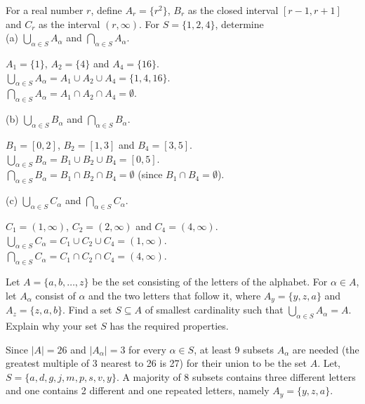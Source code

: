 \documentclass[12pt]{article}
\newenvironment{problem}[2][Problem]{\begin{trivlist}
		\item[\hskip \labelsep {\bfseries #1}\hskip \labelsep {\bfseries #2.}]}{\end{trivlist}}
\newenvironment{solution}[2][Solution]{\begin{trivlist}
		\item[\hskip \labelsep {\bfseries #1}\hskip \labelsep {\bfseries #2.}]}{\end{trivlist}}
\begin{document}
	\begin{problem}{38}
		For a real number $r$, define $A_r = \{r^{2}\}$, $B_r$ as the closed interval $[r-1,r+1]$ and $C_r$ as the interval $(r, \infty)$. For $S=\{1,2,4\}$, determine\\
		
		(a) $\bigcup_{\alpha \in S}A_{\alpha}$ and $\bigcap_{\alpha \in S}A_{\alpha}$.
		\begin{solution}{a}
			$A_{1} = \{1\}$, $A_{2} = \{4\}$ and $A_{4} = \{16\}$.\\
			 $\bigcup_{\alpha \in S}A_{\alpha} = A_{1}\cup A_{2} \cup A_{4} = \{1,4,16\}$.\\
			 $\bigcap_{\alpha \in S}A_{\alpha} = A_{1}\cap A_{2} \cap A_{4} = \emptyset$. 
		\end{solution}
	
		(b) $\bigcup_{\alpha \in S}B_{\alpha}$ and $\bigcap_{\alpha \in S}B_{\alpha}$.
		\begin{solution}{b}
			$B_{1} = [0,2]$, $B_{2}= [1,3]$ and $B_{4} = [3,5]$.\\
			$\bigcup_{\alpha \in S}B_{\alpha} = B_{1}\cup B_{2}\cup B_{4} = [0,5]$.\\
			$\bigcap_{\alpha \in S}B_{\alpha} = B_{1}\cap B_{2}\cap B_{4} = \emptyset$ (since $B_{1}\cap B_{4} = \emptyset$).\\
		\end{solution}
	
		(c) $\bigcup_{\alpha \in S}C_{\alpha}$ and $\bigcap_{\alpha \in S}C_{\alpha}$.
		\begin{solution}{c}
			$C_{1} = (1,\infty)$, $C_{2} = (2,\infty)$ and $C_{4} = (4,\infty)$.\\
			 $\bigcup_{\alpha \in S}C_{\alpha} = C_{1}\cup C_{2} \cup C_{4} = (1,\infty)$.\\
			 $\bigcap_{\alpha \in S}C_{\alpha} = C_{1}\cap C_{2} \cap C_{4} = (4,\infty)$.\\
		\end{solution}
	\end{problem}
	\begin{problem}{39}
		Let $A=\{a,b,\ldots,z\}$ be the set consisting of the letters of the alphabet. For $\alpha \in A$, let $A_{\alpha}$ consist of $\alpha$ and the two letters that follow it, where $A_{y} = \{y,z,a\}$ and $A_{z} = \{z,a,b\}$. Find a set $S\subseteq A$ of smallest cardinality such that $\bigcup_{\alpha \in S}A_{\alpha} = A$. Explain why your set $S$ has the required properties.
		\begin{solution}{}
		Since $|A|=26$ and $|A_{\alpha}|=3$ for every $\alpha \in S$, at least 9 subsets $A_{\alpha}$ are needed (the greatest multiple of 3 nearest to 26 is 27) for their union to be the set $A$.
			Let, $S=\{a,d,g,j,m,p,s,v,y\}$.
			 A majority of 8 subsets contains three different letters and one contains 2 different and one repeated letters, namely $A_{y} = \{y,z,a\}$.\\
		\end{solution} 
	\end{problem}
	
\end{document}
